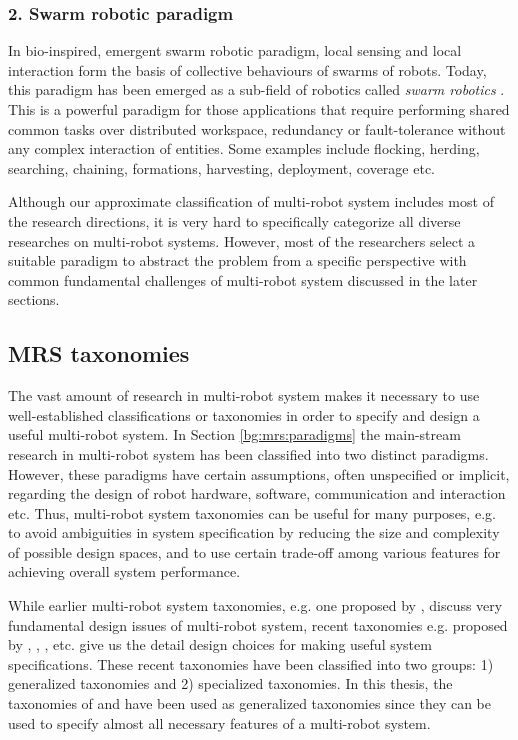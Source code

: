 \subsubsection*{2. Swarm robotic paradigm}
In bio-inspired, emergent swarm robotic paradigm, local sensing and local interaction form the basis of collective behaviours of swarms of robots. Today, this paradigm has been emerged as a sub-field of robotics called {\em swarm robotics} \cite{Sahin+2005}. This is a powerful paradigm for those applications that require performing shared common tasks over distributed workspace, redundancy or fault-tolerance without any complex interaction of entities. Some examples include flocking, herding, searching, chaining, formations, harvesting, deployment, coverage etc. 

Although our approximate classification of multi-robot system includes most of the research directions, it is very hard to specifically categorize all diverse researches on multi-robot systems. However, most of the researchers select a suitable paradigm to abstract the problem from a specific perspective with common fundamental challenges of multi-robot system discussed in the later sections.
\subsection{MRS taxonomies}
\label{bg:mrs:taxonomies}
The vast amount of research in multi-robot system makes it necessary to use well-established classifications or taxonomies in order to specify and design a useful multi-robot system. In Section \ref{bg:mrs:paradigms} the main-stream research in multi-robot system has been classified into two distinct paradigms. However, these paradigms have certain assumptions, often unspecified or implicit, regarding the design of robot hardware, software, communication and interaction etc. Thus, multi-robot system taxonomies can be useful for many purposes, e.g. to avoid ambiguities in system specification by reducing the size and complexity of possible design spaces, and to use certain trade-off among various features for achieving overall system performance.

While earlier multi-robot system taxonomies, e.g. one proposed by ,  discuss very fundamental design issues of multi-robot system, recent taxonomies e.g. proposed by , , ,  etc. give us the detail design choices for making useful system specifications.  These recent taxonomies have been classified into two groups: 1) generalized taxonomies and 2) specialized taxonomies. In this thesis, the taxonomies of  and  have been used as generalized taxonomies since they  can be used to specify almost all necessary features of a multi-robot system.   

